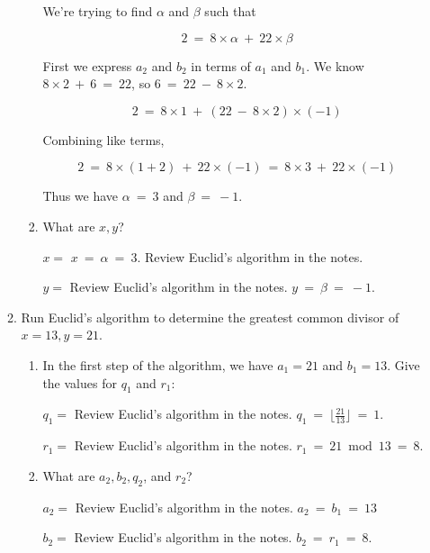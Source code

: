 \documentclass[11pt, preview]{standalone} %
\begin{document}
\begin{enumerate}
\begin{enumerate}
\begin{enumerate}
\begin{Freeform}{-1}
We're trying to find $\alpha$ and $\beta$ such that

$$2\ =\ 8 \times \alpha\ +\ 22 \times \beta$$

First we express $a_2$ and $b_2$ in terms of $a_1$ and $b_1$. We know $8 \times 2\ +\ 6\ =\ 22$, so $6\ =\ 22\ -\ 8 \times 2$.

$$2\ =\ 8 \times 1\ +\ (22\ -\ 8 \times 2) \times (-1)$$

Combining like terms, 

$$2\ =\ 8 \times (1 + 2)\ +\ 22 \times (-1)\ =\ 8 \times 3\ +\ 22\times (-1)$$

Thus we have $\alpha\ =\ 3$ and $\beta\ =\ -1$.
\end{Freeform}
\item What are $x, y$?
\begin{Freeform}{3}
$x = $
\Solution $x\ =\ \alpha\ =\ 3$.
\Hint Review Euclid's algorithm in the notes.
\end{Freeform}
\begin{Freeform}{-1}
$y = $
\Hint Review Euclid's algorithm in the notes.
\Solution $y\ =\ \beta\ =\ -1$.
\end{Freeform}
\end{enumerate}
\item Run Euclid's algorithm to determine the greatest common divisor of $x = 13, y = 21$.
\begin{enumerate}
\item In the first step of the algorithm, we have $a_1 = 21$ and $b_1 = 13$. Give the values for $q_1$ and $r_1$:
\begin{Freeform}{1}
$q_1 = $
\Hint Review Euclid's algorithm in the notes.
\Solution $q_1\ =\ \lfloor \frac{21}{13} \rfloor\ =\ 1$.
\end{Freeform}
\begin{Freeform}{8}
$r_1 = $
\Hint Review Euclid's algorithm in the notes.
\Solution $r_1\ =\ 21 \bmod 13\ =\ 8$.
\end{Freeform}
\item What are $a_2, b_2, q_2$, and $r_2$?
\begin{Freeform}{13}
$a_2 = $
\Hint Review Euclid's algorithm in the notes.
\Solution $a_2\ =\ b_1\ =\ 13$
\end{Freeform}
\begin{Freeform}{8}
$b_2 = $
\Hint Review Euclid's algorithm in the notes.
\Solution $b_2\ =\ r_1\ =\ 8$.
\end{Freeform}
\begin{Freeform}{1}

\end{Freeform}
\end{enumerate}
\end{enumerate}
\end{enumerate}
\end{document}
